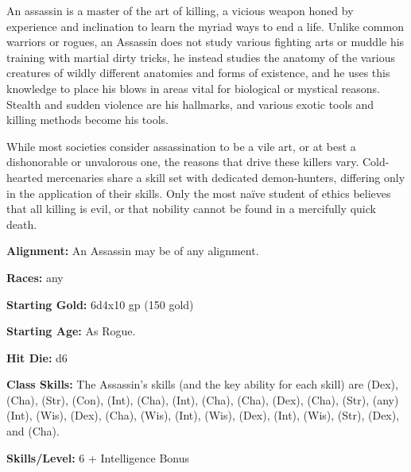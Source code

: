 
An assassin is a master of the art of killing, a vicious weapon honed by experience and inclination to learn the myriad ways to end a life. Unlike common warriors or rogues, an Assassin does not study various fighting arts or muddle his training with martial dirty tricks, he instead studies the anatomy of the various creatures of wildly different anatomies and forms of existence, and he uses this knowledge to place his blows in areas vital for biological or mystical reasons. Stealth and sudden violence are his hallmarks, and various exotic tools and killing methods become his tools.

While most societies consider assassination to be a vile art, or at best a dishonorable or unvalorous one, the reasons that drive these killers vary. Cold-hearted mercenaries share a skill set with dedicated demon-hunters, differing only in the application of their skills. Only the most naïve student of ethics believes that all killing is evil, or that nobility cannot be found in a mercifully quick death.

\textbf{Alignment:} An Assassin may be of any alignment.

\textbf{Races:} any

\textbf{Starting Gold:} 6d4x10 gp (150 gold)

\textbf{Starting Age:} As Rogue.

\textbf{Hit Die:} d6

\textbf{Class Skills:} The Assassin's skills (and the key ability for each skill) are  (Dex),  (Cha),  (Str),  (Con),  (Int),  (Cha),  (Int),  (Cha),  (Cha),  (Dex),  (Cha),  (Str),  (any) (Int),  (Wis),  (Dex),  (Cha),  (Wis),  (Int),  (Wis),  (Dex),  (Int),  (Wis),  (Str),  (Dex), and  (Cha).

\textbf{Skills/Level:} 6 + Intelligence Bonus

